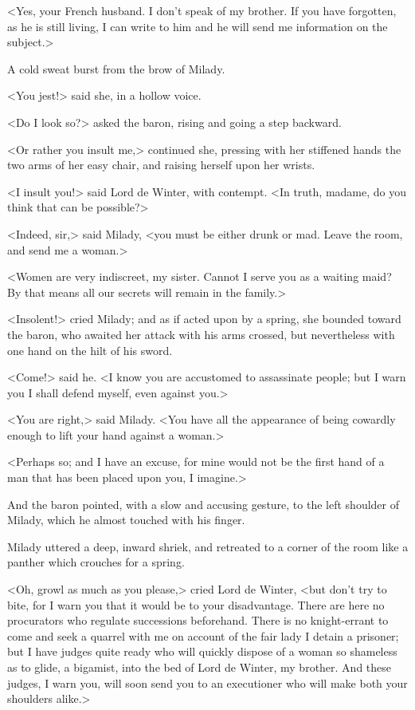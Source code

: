 <Yes, your French husband. I don't speak of my brother. If you have forgotten, as he is still living, I can write to him and he will send me information on the subject.> 

A cold sweat burst from the brow of Milady. 

<You jest!> said she, in a hollow voice. 

<Do I look so?> asked the baron, rising and going a step backward. 

<Or rather you insult me,> continued she, pressing with her stiffened hands the two arms of her easy chair, and raising herself upon her wrists. 

<I insult you!> said Lord de Winter, with contempt. <In truth, madame, do you think that can be possible?> 

<Indeed, sir,> said Milady, <you must be either drunk or mad. Leave the room, and send me a woman.> 

<Women are very indiscreet, my sister. Cannot I serve you as a waiting maid? By that means all our secrets will remain in the family.> 

<Insolent!> cried Milady; and as if acted upon by a spring, she bounded toward the baron, who awaited her attack with his arms crossed, but nevertheless with one hand on the hilt of his sword. 

<Come!> said he. <I know you are accustomed to assassinate people; but I warn you I shall defend myself, even against you.> 

<You are right,> said Milady. <You have all the appearance of being cowardly enough to lift your hand against a woman.> 

<Perhaps so; and I have an excuse, for mine would not be the first hand of a man that has been placed upon you, I imagine.> 

And the baron pointed, with a slow and accusing gesture, to the left shoulder of Milady, which he almost touched with his finger. 

Milady uttered a deep, inward shriek, and retreated to a corner of the room like a panther which crouches for a spring. 

<Oh, growl as much as you please,> cried Lord de Winter, <but don't try to bite, for I warn you that it would be to your disadvantage. There are here no procurators who regulate successions beforehand. There is no knight-errant to come and seek a quarrel with me on account of the fair lady I detain a prisoner; but I have judges quite ready who will quickly dispose of a woman so shameless as to glide, a bigamist, into the bed of Lord de Winter, my brother. And these judges, I warn you, will soon send you to an executioner who will make both your shoulders alike.> 

